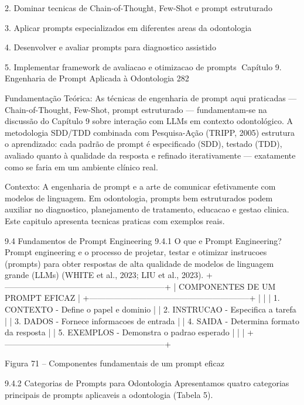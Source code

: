   2. Dominar tecnicas de Chain-of-Thought, Few-Shot e prompt estruturado

  3. Aplicar prompts especializados em diferentes areas da odontologia

  4. Desenvolver e avaliar prompts para diagnostico assistido

  5. Implementar framework de avaliacao e otimizacao de prompts
Capítulo 9. Engenharia de Prompt Aplicada à Odontologia                               282


Fundamentação Teórica: As técnicas de engenharia de prompt aqui praticadas —
Chain-of-Thought, Few-Shot, prompt estruturado — fundamentam-se na discussão
do Capítulo 9 sobre interação com LLMs em contexto odontológico. A metodologia
SDD/TDD combinada com Pesquisa-Ação (TRIPP, 2005) estrutura o aprendizado: cada
padrão de prompt é especificado (SDD), testado (TDD), avaliado quanto à qualidade
da resposta e refinado iterativamente — exatamente como se faria em um ambiente
clínico real.

   Contexto: A engenharia de prompt e a arte de comunicar efetivamente com
   modelos de linguagem. Em odontologia, prompts bem estruturados podem
   auxiliar no diagnostico, planejamento de tratamento, educacao e gestao clinica.
   Este capitulo apresenta tecnicas praticas com exemplos reais.


9.4     Fundamentos de Prompt Engineering
9.4.1    O que e Prompt Engineering?
Prompt engineering e o processo de projetar, testar e otimizar instrucoes (prompts) para
obter respostas de alta qualidade de modelos de linguagem grande (LLMs) (WHITE et
al., 2023; LIU et al., 2023).
+-----------------------------------------------------------+
|             COMPONENTES DE UM PROMPT EFICAZ                |
+-----------------------------------------------------------+
|                                                            |
| 1. CONTEXTO      - Define o papel e dominio              |
| 2. INSTRUCAO     - Especifica a tarefa                   |
| 3. DADOS         - Fornece informacoes de entrada        |
| 4. SAIDA         - Determina formato da resposta         |
| 5. EXEMPLOS      - Demonstra o padrao esperado           |
|                                                            |
+-----------------------------------------------------------+

             Figura 71 – Componentes fundamentais de um prompt eficaz


9.4.2    Categorias de Prompts para Odontologia
Apresentamos quatro categorias principais de prompts aplicaveis a odontologia (Tabela
5).


